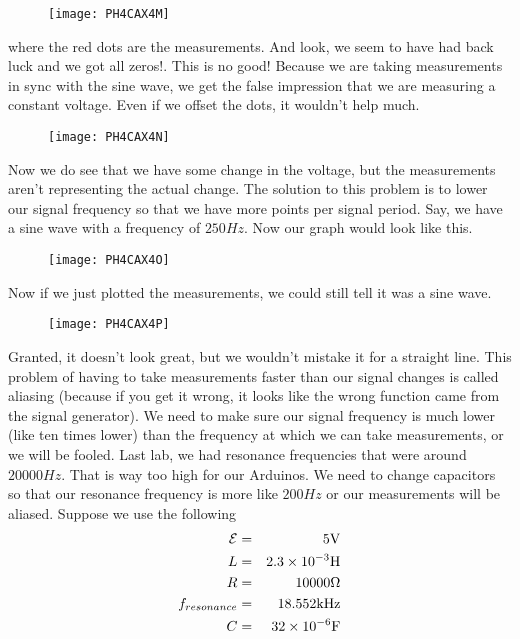 \begin{figure}[h!]
\texttt{[image: PH4CAX4M]}
\end{figure}

where the red dots are the measurements. And look, we seem to have had back
luck and we got all zeros!. This is no good! Because we are taking
measurements in sync with the sine wave, we get the false impression that we
are measuring a constant voltage. Even if we offset the dots, it wouldn't
help much.\begin{figure}[h!]
\texttt{[image: PH4CAX4N]}
\end{figure}Now we do see that we have some
change in the voltage, but the measurements aren't representing the actual
change. The solution to this problem is to lower our signal frequency so
that we have more points per signal period. Say, we have a sine wave with a
frequency of $250\unit{Hz}.$ Now our graph would look like this. \begin{figure}[h!]
\texttt{[image: PH4CAX4O]}
\end{figure}

Now if we just plotted the measurements, we could still tell it was a sine
wave.\begin{figure}[h!]
\texttt{[image: PH4CAX4P]}
\end{figure}Granted, it doesn't look great,
but we wouldn't mistake it for a straight line. This problem of having to
take measurements faster than our signal changes is called aliasing (because
if you get it wrong, it looks like the wrong function came from the signal
generator). We need to make sure our signal frequency is much lower (like
ten times lower) than the frequency at which we can take measurements, or we
will be fooled. Last lab, we had resonance frequencies that were around $%
20000\unit{Hz}.$ That is way too high for our Arduinos. We need to change
capacitors so that our resonance frequency is more like $200\unit{Hz}$ or
our measurements will be aliased. Suppose we use the following 
\begin{eqnarray*}
\mathcal{E} &=&5\unit{V} \\
L &=&2.3\times 10^{-3}\unit{H} \\
R &=&10000\unit{%
\Omega%
} \\
f_{resonance} &=&18.552\unit{kHz} \\
C &=&32\times 10^{-6}\unit{F}
\end{eqnarray*}

